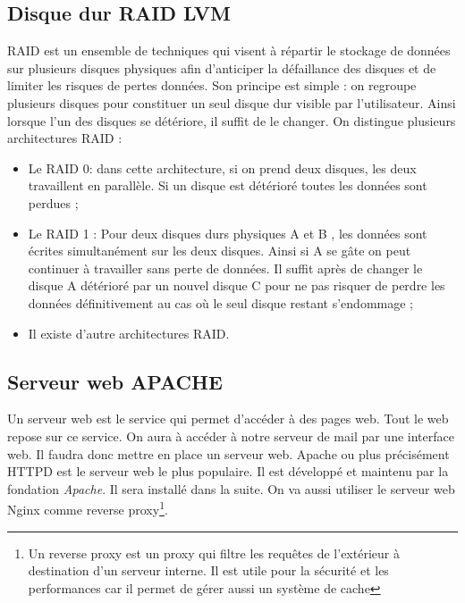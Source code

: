 \documentclass[a4paper,12pt,french]{report} %
\begin{document}
\subsection{Disque dur RAID LVM}
RAID est un ensemble de techniques qui visent à répartir le stockage de données sur plusieurs disques physiques afin d'anticiper la défaillance des disques et de limiter les risques de pertes données. Son principe est simple : on regroupe plusieurs disques pour constituer un seul disque dur visible par l'utilisateur. Ainsi lorsque l'un des disques se détériore, il suffit de le changer. On distingue plusieurs architectures RAID :
\begin{itemize}
	\item Le RAID 0: dans cette architecture, si on prend deux disques, les deux travaillent en parallèle. Si un disque est détérioré toutes les données sont perdues ;
	\item Le RAID 1 : Pour deux disques durs physiques A et B , les données sont écrites simultanément sur les deux disques. Ainsi si A se gâte on peut continuer à travailler sans perte de données. Il suffit après de changer le disque A détérioré par un nouvel disque C pour ne pas risquer de perdre les données définitivement au cas où le seul disque restant s'endommage ;
	\item Il existe d'autre architectures RAID.
\end{itemize}

\subsection{Serveur web APACHE}
Un serveur web est le service qui permet d'accéder à des pages web. Tout le web repose sur ce service. On aura à accéder à notre serveur de mail par une interface web. Il faudra donc mettre en place un serveur web. Apache ou plus précisément HTTPD est le serveur web le plus populaire. Il est développé et maintenu par la fondation \emph{Apache}. Il sera installé dans la suite. On va aussi utiliser le serveur web Nginx comme reverse proxy\footnote{Un reverse proxy est un proxy qui filtre les requêtes de l'extérieur à destination d'un serveur interne. Il est utile pour la sécurité et les performances car il permet de gérer aussi un système de cache}.
\end{document}
